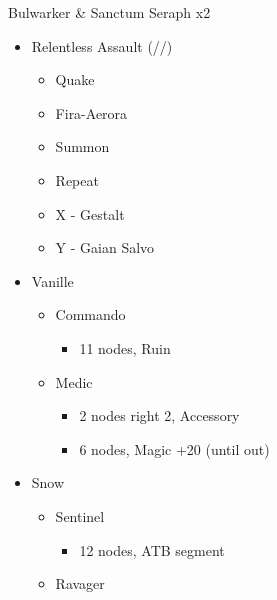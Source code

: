 \begin{multicols}{2}
\renewcommand{\second}{[2] Relentless Assault (\rav/\rav/\com)}

\begin{battle}{Bulwarker \& Sanctum Seraph x2}
  \begin{itemize}
    \item \second
          \begin{itemize}
            \item Quake
            \item Fira-Aerora
            \item Summon
            \item Repeat
            \item X - Gestalt
            \item Y - Gaian Salvo
          \end{itemize}
  \end{itemize}
\end{battle}
\vfill
\begin{menu}
  \begin{itemize}
    \crystarium
    \begin{itemize}
      \item Vanille
            \begin{itemize}
              \item Commando
                    \begin{itemize}
                      \item 11 nodes, Ruin
                    \end{itemize}
              \item Medic
                    \begin{itemize}
                      \item 2 nodes right 2, Accessory
                      \item 6 nodes, Magic +20 (until out)
                    \end{itemize}
            \end{itemize}
      \item Snow
            \begin{itemize}
              \item Sentinel
                    \begin{itemize}
                      \item 12 nodes, ATB segment
                    \end{itemize}
              \item Ravager
                    \begin{itemize}

\end{itemize}
\end{itemize}
\end{itemize}
\end{itemize}
\end{menu}
\end{multicols}
